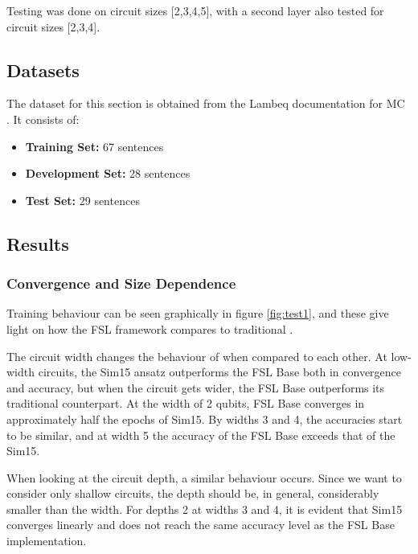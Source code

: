 Testing was done on circuit sizes [2,3,4,5], with a second layer also tested for circuit sizes [2,3,4].

\subsection{Datasets}
The dataset for this section is obtained from the Lambeq documentation for MC \cite{kartsaklis_lambeq_2021}. It consists of:
\begin{itemize}
    \item \textbf{Training Set:} 67 sentences
    \item  \textbf{Development Set:} 28 sentences
    \item \textbf{Test Set:} 29 sentences
\end{itemize}

\subsection{Results}
\subsubsection{Convergence and Size Dependence}
Training behaviour can be seen graphically in figure \ref{fig:test1}, and these give light on how the FSL framework compares to traditional \mya.

The circuit width changes the behaviour of \mya when compared to each other. At low-width circuits, the Sim15 ansatz outperforms the FSL Base both in convergence and accuracy, but when the circuit gets wider, the FSL Base outperforms its traditional counterpart. At the width of 2 qubits, FSL Base converges in approximately half the epochs of Sim15. By widths 3 and 4, the accuracies start to be similar, and at width 5 the accuracy of the FSL Base exceeds that of the Sim15.

When looking at the circuit depth, a similar behaviour occurs. Since we want to consider only shallow circuits, the depth should be, in general, considerably smaller than the width. For depths 2 at widths 3 and 4, it is evident that Sim15 converges linearly and does not reach the same accuracy level as the FSL Base implementation.

